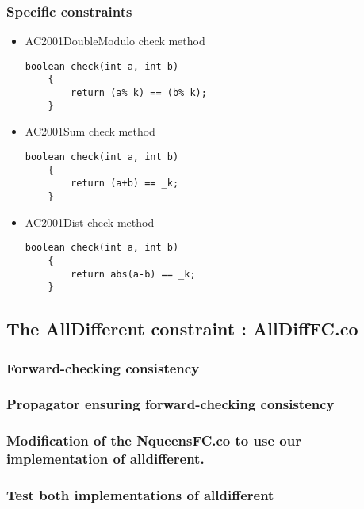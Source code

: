 \documentclass{eplDoc}
\begin{document}
\subsubsection{Specific constraints}
\begin{itemize}
\item AC2001DoubleModulo check method  

\begin{lstlisting}
boolean check(int a, int b)
    {
        return (a%_k) == (b%_k);
    }
\end{lstlisting}

\item AC2001Sum check method  

\begin{lstlisting}
boolean check(int a, int b)
    {
        return (a+b) == _k;
    }
  \end{lstlisting}
  
\item AC2001Dist check method 

\begin{lstlisting}
boolean check(int a, int b)
    { 
        return abs(a-b) == _k;
    }
    \end{lstlisting}
\end{itemize}
\subsection{The AllDifferent constraint : AllDiffFC.co} %

\subsubsection{Forward-checking consistency}

\subsubsection{Propagator ensuring forward-checking consistency}

\subsubsection{Modification of the NqueensFC.co to use our implementation of alldifferent.}

\subsubsection{Test both implementations of alldifferent}
\end{document}
